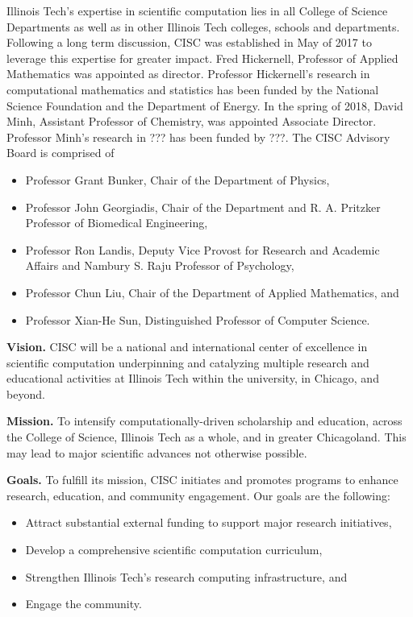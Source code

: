 \documentclass{amsart}
\begin{document}
Illinois Tech's expertise in scientific computation lies in all College of Science Departments as well as in other Illinois Tech colleges, schools and departments.  Following a long term discussion, CISC was established in May of 2017 to leverage this expertise for greater impact.  Fred Hickernell, Professor of Applied Mathematics was appointed as director.  Professor Hickernell's research in computational mathematics and statistics has been funded by the National Science Foundation and the Department of Energy.  In the spring of 2018, David Minh, Assistant Professor of Chemistry, was appointed Associate Director.  Professor Minh's research in ??? has been funded by ???.  The CISC Advisory Board is comprised of 
\begin{itemize}
    \item Professor Grant Bunker, Chair of the Department of Physics, 
    \item Professor John Georgiadis, Chair of  the Department and R. A. Pritzker Professor of Biomedical Engineering,
    
    \item Professor Ron Landis, Deputy Vice Provost for Research and Academic Affairs and
Nambury S. Raju Professor of Psychology,

    \item Professor Chun Liu, Chair of the Department of Applied Mathematics, and

    \item Professor Xian-He Sun, Distinguished Professor of Computer Science.
\end{itemize}

\textbf{Vision.}
CISC will be a national and international center of excellence in scientific computation underpinning and catalyzing multiple research and educational activities at Illinois Tech within the university, in Chicago, and beyond.

\textbf{Mission.}
To intensify computationally-driven scholarship and education, across the College of Science, Illinois Tech as a whole, and in greater Chicagoland.  This may lead to major scientific advances not otherwise possible.

\textbf{Goals.}
To fulfill its mission, CISC initiates and promotes programs to enhance research, education, and community engagement.  Our goals are the following:
\begin{itemize}
    \item Attract substantial external funding to support major research initiatives,
    
    \item Develop a comprehensive scientific computation curriculum,

    \item Strengthen Illinois Tech’s research computing infrastructure, and
    
    \item Engage the community.
    
\end{itemize}
\end{document}
